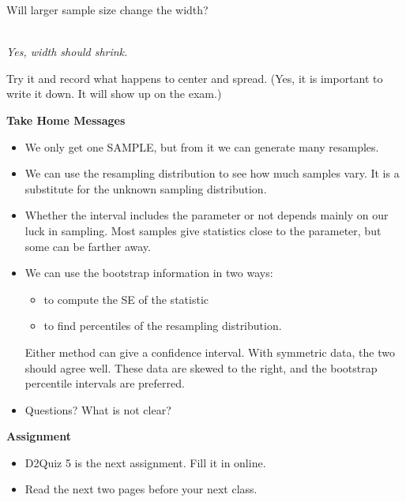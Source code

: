 \begin{enumerate}
   Will larger sample size  change the width?\\
\begin{students}
        \vspace{.5cm}        
\end{students}
\begin{key}
\\ {\it Yes, width should shrink.}
\end{key}

   Try it and record what happens to center and spread.  (Yes, it is
   important to write it down. It will show up on the exam.)
   \vfill
\end{enumerate}

\begin{center}
  {\bf Take Home Messages}
\end{center}
\begin{itemize}
  \item   We only get one SAMPLE, but from it we can generate many
    resamples.
  \item We can use the resampling distribution to see how much
    samples vary. It is a substitute for the unknown sampling
    distribution.
  \item Whether the interval includes the parameter or not
    depends mainly on our luck in sampling.  Most samples give statistics
    close to the parameter, but some can be farther away.
  \item We can use the bootstrap information in two ways:
    \begin{itemize}
    \item to compute the SE of the statistic
    \item to find percentiles of the resampling distribution.
    \end{itemize}
   Either method can give a confidence interval.  With symmetric data, the
   two should agree well.  These data are skewed to the right, and the
   bootstrap percentile intervals are preferred.
 \item 
  Questions?  What is not clear?\vfill
  \end{itemize}
  

\noindent
{\bf Assignment} \vspace{-.2in}
\begin{itemize}
\item D2Quiz 5 is the next assignment.  Fill it in online.
\item Read the next two pages before your next class.
\end{itemize}

